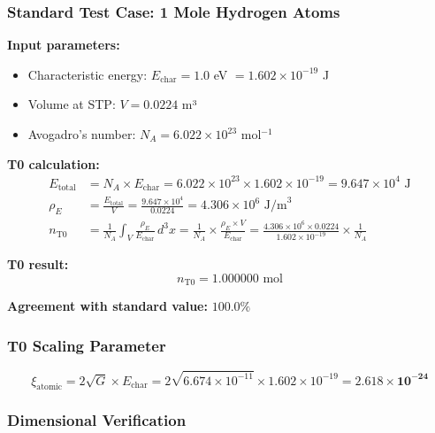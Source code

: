 \documentclass[12pt,a4paper]{article}
\newcommand{\xipar}{\xi}
\newcommand{\rhoE}{\rho_E}
\newcommand{\Echar}{E_{\text{char}}}
\begin{document}
	\subsubsection{Standard Test Case: 1 Mole Hydrogen Atoms}
	\label{subsubsec:mol_hydrogen_test}
	
	\textbf{Input parameters:}
	\begin{itemize}
		\item Characteristic energy: $\Echar = 1.0$ eV $= 1.602 \times 10^{-19}$ J
		\item Volume at STP: $V = 0.0224$ m³
		\item Avogadro's number: $N_A = 6.022 \times 10^{23}$ mol$^{-1}$
	\end{itemize}
	
	\textbf{T0 calculation:}
	\begin{align}
		E_{\text{total}} &= N_A \times \Echar = 6.022 \times 10^{23} \times 1.602 \times 10^{-19} = 9.647 \times 10^{4} \text{ J} \\
		\rhoE &= \frac{E_{\text{total}}}{V} = \frac{9.647 \times 10^{4}}{0.0224} = 4.306 \times 10^{6} \text{ J/m}^3 \\
		n_{\text{T0}} &= \frac{1}{N_A} \int_V \frac{\rhoE}{\Echar} \, d^3x = \frac{1}{N_A} \times \frac{\rhoE \times V}{\Echar} = \frac{4.306 \times 10^{6} \times 0.0224}{1.602 \times 10^{-19}} \times \frac{1}{N_A}
	\end{align}
	
	\textbf{T0 result:}
	\begin{equation}
		\boxed{n_{\text{T0}} = 1.000000 \text{ mol}}
		\label{eq:mol_t0_result}
	\end{equation}
	
	\textbf{Agreement with standard value:} $\mathbf{100.0\%}$
	
	\subsubsection{T0 Scaling Parameter}
	\label{subsubsec:mol_scaling_parameter}
	
	\begin{equation}
		\xipar_{\text{atomic}} = 2\sqrt{G} \times \Echar = 2\sqrt{6.674 \times 10^{-11}} \times 1.602 \times 10^{-19} = \mathbf{2.618 \times 10^{-24}}
		\label{eq:xi_atomic_calculated}
	\end{equation}
	
	\subsubsection{Dimensional Verification}
	\label{subsubsec:mol_dimensional_verification}
	
\end{document}

